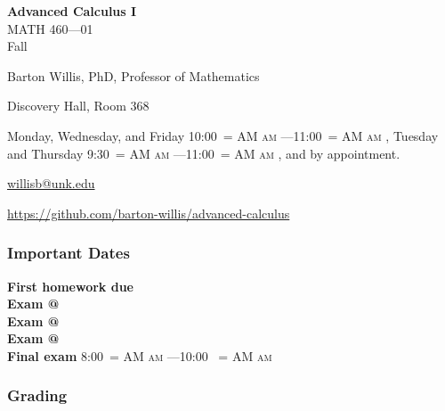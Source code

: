 \documentclass[12pt]{article}
\makeatletter
\newcommand*{\rom}[1]{\expandafter\@slowromancap\romannumeral #1@}
\newcounter{ex}\setcounter{ex}{0}
\newenvironment{mypar}[2]
  {\begin{list}{}%
    {\setlength\leftmargin{#1}
    \setlength\rightmargin{#2}}
    \item[]}
  {\end{list}}
\renewenvironment{description}[0]{\begin{compactdesc}}{\end{compactdesc}}
\DeclareRobustCommand{\maybefakesc}[1]{%
  \ifnum\pdfstrcmp{\f@series}{\bfdefault}=\z@
    {\fontsize{\dimexpr0.8\dimexpr\f@size pt\relax}{0}\selectfont\uppercase{#1}}%
  \else
    \textsc{#1}%
  \fi
}
\newcommand\AM{\,\maybefakesc{am}\xspace}
\newcommand{\coursename}{Advanced Calculus I}
\newcommand{\coursenumber}{MATH 460}
\newcommand{\sectionnumber}{01}
\newcommand{\term}{Fall }
\newcommand{\officehours}{ Monday, Wednesday, and Friday 10:00\AM---11:00\AM,
    Tuesday and Thursday 9:30\AM---11:00\AM, and by appointment.}
\newcommand{\finaldateandtime}{\printdate{13/12/\the\year} 8:00\AM{}---10:00 \AM}
\makeatother
\begin{document}
\cleanlookdateon%
\shortdate
\printyearoff
\large
\begin{center}
    \textbf{\coursename}  \\
    {\coursenumber---\sectionnumber} \\
     {\term \the\year} \\
\end{center}

\vskip0.25in
\normalsize


\begin{center}
\begin{description}
    \item[Instructor:] Barton Willis, PhD, Professor of Mathematics
    \item[Office:]  Discovery Hall, Room 368
    \item[Office Hours: ] \officehours
    \item[\phone:]  
    \item[\Email:]  \href{mailto:willisb@unk.edu}{willisb@unk.edu}
    \item[\faGithub]   \url{https://github.com/barton-willis/advanced-calculus}

  \end{description}
\end{center}



\subsubsection*{Important Dates}

\begin{mypar}{0.25in}{0.25in} 

  \textbf{First homework due} \dotfill  {}  \\
  \textbf{Exam \rom{1}} \dotfill {}  \\
  \textbf{Exam \rom{2}} \dotfill  {} \\
  \textbf{Exam \rom{3}} \dotfill {} \\
  \textbf{Final exam} \dotfill  \finaldateandtime
\end{mypar}

\subsubsection*{Grading}
\end{document}
